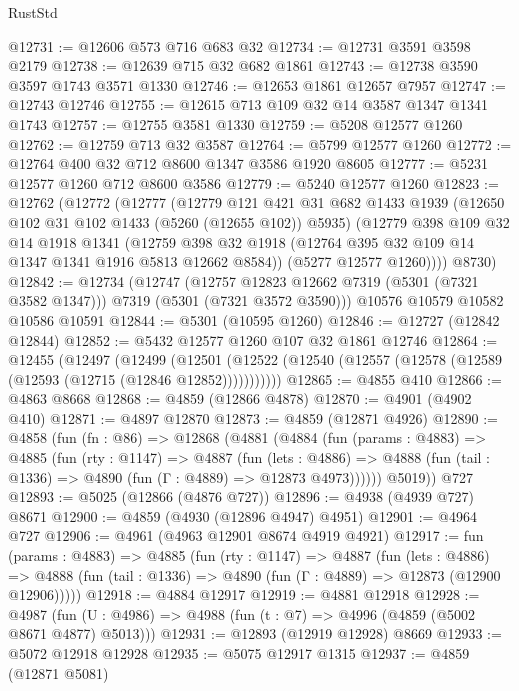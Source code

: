 \begin{lexlean}{RustStd}
\begin{coremodule}
@12731 := @12606 @573 @716 @683 @32
@12734 := @12731 @3591 @3598 @2179
@12738 := @12639 @715 @32 @682 @1861
@12743 := @12738 @3590 @3597 @1743 @3571 @1330
@12746 := @12653 @1861 @12657 @7957
@12747 := @12743 @12746
@12755 := @12615 @713 @109 @32 @14 @3587 @1347 @1341 @1743
@12757 := @12755 @3581 @1330
@12759 := @5208 @12577 @1260
@12762 := @12759 @713 @32 @3587
@12764 := @5799 @12577 @1260
@12772 := @12764 @400 @32 @712 @8600 @1347 @3586 @1920 @8605
@12777 := @5231 @12577 @1260 @712 @8600 @3586
@12779 := @5240 @12577 @1260
@12823 := @12762
    (@12772
      (@12777
        (@12779
          @121
          @421
          @31
          @682
          @1433
          @1939
          (@12650 @102 @31 @102 @1433 (@5260 (@12655 @102)) @5935)
          (@12779
            @398
            @109
            @32
            @14
            @1918
            @1341
            (@12759 @398 @32 @1918 (@12764 @395 @32 @109 @14 @1347 @1341 @1916 @5813 @12662 @8584))
            (@5277 @12577 @1260))))
      @8730)
@12842 := @12734
    (@12747
      (@12757 @12823 @12662 @7319 (@5301 (@7321 @3582 @1347)))
      @7319
      (@5301 (@7321 @3572 @3590)))
    @10576
    @10579
    @10582
    @10586
    @10591
@12844 := @5301 (@10595 @1260)
@12846 := @12727 (@12842 @12844)
@12852 := @5432 @12577 @1260 @107 @32 @1861 @12746
@12864 := @12455
    (@12497
      (@12499
        (@12501 (@12522 (@12540 (@12557 (@12578 (@12589 (@12593 (@12715 (@12846 @12852)))))))))))
@12865 := @4855 @410
@12866 := @4863 @8668
@12868 := @4859 (@12866 @4878)
@12870 := @4901 (@4902 @410)
@12871 := @4897 @12870
@12873 := @4859 (@12871 @4926)
@12890 := @4858
    (fun (fn : @86) =>
    @12868
      (@4881
        (@4884
          (fun (params : @4883) =>
          @4885
            (fun (rty : @1147) =>
            @4887
              (fun (lets : @4886) =>
              @4888 (fun (tail : @1336) => @4890 (fun (Γ : @4889) => @12873 @4973))))))
        @5019))
    @727
@12893 := @5025 (@12866 (@4876 @727))
@12896 := @4938 (@4939 @727) @8671
@12900 := @4859 (@4930 (@12896 @4947) @4951)
@12901 := @4964 @727
@12906 := @4961 (@4963 @12901 @8674 @4919 @4921)
@12917 := fun (params : @4883) =>
  @4885
    (fun (rty : @1147) =>
    @4887
      (fun (lets : @4886) =>
      @4888 (fun (tail : @1336) => @4890 (fun (Γ : @4889) => @12873 (@12900 @12906)))))
@12918 := @4884 @12917
@12919 := @4881 @12918
@12928 := @4987 (fun (U : @4986) => @4988 (fun (t : @7) => @4996 (@4859 (@5002 @8671 @4877) @5013)))
@12931 := @12893 (@12919 @12928) @8669
@12933 := @5072 @12918 @12928
@12935 := @5075 @12917 @1315
@12937 := @4859 (@12871 @5081)

\end{coremodule}
\end{lexlean}
